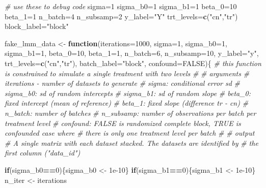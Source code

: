 \documentclass[]{book}
\newenvironment{Shaded}{\begin{snugshade}}{\end{snugshade}}
\newcommand{\CommentTok}[1]{\textcolor[rgb]{0.56,0.35,0.01}{\textit{#1}}}
\newcommand{\ControlFlowTok}[1]{\textcolor[rgb]{0.13,0.29,0.53}{\textbf{#1}}}
\newcommand{\DataTypeTok}[1]{\textcolor[rgb]{0.13,0.29,0.53}{#1}}
\newcommand{\DecValTok}[1]{\textcolor[rgb]{0.00,0.00,0.81}{#1}}
\newcommand{\FloatTok}[1]{\textcolor[rgb]{0.00,0.00,0.81}{#1}}
\newcommand{\KeywordTok}[1]{\textcolor[rgb]{0.13,0.29,0.53}{\textbf{#1}}}
\newcommand{\NormalTok}[1]{#1}
\newcommand{\OperatorTok}[1]{\textcolor[rgb]{0.81,0.36,0.00}{\textbf{#1}}}
\newcommand{\OtherTok}[1]{\textcolor[rgb]{0.56,0.35,0.01}{#1}}
\newcommand{\StringTok}[1]{\textcolor[rgb]{0.31,0.60,0.02}{#1}}
\begin{document}
\begin{Shaded}
\begin{Highlighting}[]
\CommentTok{# use these to debug code}
\NormalTok{sigma=}\DecValTok{1}
\NormalTok{sigma_b0=}\DecValTok{1}
\NormalTok{sigma_b1=}\DecValTok{1}
\NormalTok{beta_}\DecValTok{0}\NormalTok{=}\DecValTok{10}
\NormalTok{beta_}\DecValTok{1}\NormalTok{=}\DecValTok{1}
\NormalTok{n_batch=}\DecValTok{4}
\NormalTok{n_subsamp=}\DecValTok{2}
\NormalTok{y_label=}\StringTok{"Y"}
\NormalTok{trt_levels=}\KeywordTok{c}\NormalTok{(}\StringTok{"cn"}\NormalTok{,}\StringTok{"tr"}\NormalTok{)}
\NormalTok{block_label=}\StringTok{"block"}

\NormalTok{fake_lmm_data <-}\StringTok{ }\ControlFlowTok{function}\NormalTok{(}\DataTypeTok{iterations=}\DecValTok{1000}\NormalTok{, }\DataTypeTok{sigma=}\DecValTok{1}\NormalTok{, }\DataTypeTok{sigma_b0=}\DecValTok{1}\NormalTok{, }\DataTypeTok{sigma_b1=}\DecValTok{1}\NormalTok{, }\DataTypeTok{beta_0=}\DecValTok{10}\NormalTok{, }\DataTypeTok{beta_1=}\DecValTok{1}\NormalTok{, }\DataTypeTok{n_batch=}\DecValTok{6}\NormalTok{, }\DataTypeTok{n_subsamp=}\DecValTok{10}\NormalTok{, }\DataTypeTok{y_label=}\StringTok{"y"}\NormalTok{, }\DataTypeTok{trt_levels=}\KeywordTok{c}\NormalTok{(}\StringTok{"cn"}\NormalTok{,}\StringTok{"tr"}\NormalTok{), }\DataTypeTok{batch_label=}\StringTok{"block"}\NormalTok{, }\DataTypeTok{confound=}\OtherTok{FALSE}\NormalTok{)\{}
  \CommentTok{# this function is constrained to simulate a single treatment with two levels}
  \CommentTok{#}
  \CommentTok{#                   arguments }
  \CommentTok{# iterations - number of datasets to generate}
  \CommentTok{# sigma: conditional error sd}
  \CommentTok{# sigma_b0: sd of random intercepts}
  \CommentTok{# sigma_b1: sd of random slope}
  \CommentTok{# beta_0: fixed intercept (mean of reference)}
  \CommentTok{# beta_1: fixed slope (difference tr - cn)}
  \CommentTok{# n_batch: number of batches}
  \CommentTok{# n_subsamp: number of observations per batch per treatment level}
  \CommentTok{# confound: FALSE is randomized complete block, TRUE is confounded case where}
  \CommentTok{#       there is only one treatment level per batch}
  \CommentTok{#}
  \CommentTok{#                    output}
  \CommentTok{# A single matrix with each dataset stacked. The datasets are identified by}
  \CommentTok{# the first column ("data_id")}
  
  \ControlFlowTok{if}\NormalTok{(sigma_b0}\OperatorTok{==}\DecValTok{0}\NormalTok{)\{sigma_b0 <-}\StringTok{ }\FloatTok{1e-10}\NormalTok{\}}
  \ControlFlowTok{if}\NormalTok{(sigma_b1}\OperatorTok{==}\DecValTok{0}\NormalTok{)\{sigma_b1 <-}\StringTok{ }\FloatTok{1e-10}\NormalTok{\}}
\NormalTok{  n_iter <-}\StringTok{ }\NormalTok{iterations}
  

\end{Highlighting}
\end{Shaded}
\end{document}

